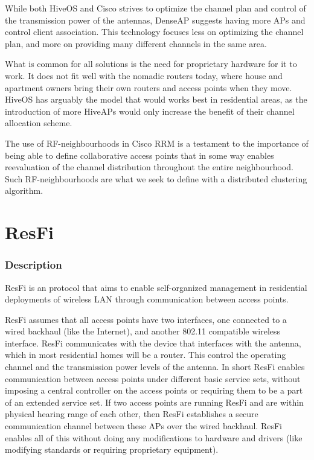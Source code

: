 		While both HiveOS and Cisco strives to optimize the channel plan and control of the transmission power of the antennas, DenseAP suggests having more APs and control client association. This technology focuses less on optimizing the channel plan, and more on providing many different channels in the same area.  

		What is common for all solutions is the need for proprietary hardware for it to work. It does not fit well with the nomadic routers today, where
		house and apartment owners bring their own routers and access points when they move.
		HiveOS has arguably the model that would works best in residential areas, as the introduction of more HiveAPs would only increase the benefit of their channel allocation scheme. 

		The use of RF-neighbourhoods in Cisco RRM is a testament to the importance of being able to define collaborative access points that in some way enables reevaluation of
		the channel distribution throughout the entire neighbourhood. Such RF-neighbourhoods are what we seek to define with a distributed clustering algorithm.

\section{ResFi}
\subsubsection{Description}
ResFi \cite{resfi} is an protocol that aims to enable self-organized management in residential deployments of wireless LAN through communication between access points.

ResFi assumes that all access points have two interfaces, one connected to a wired backhaul (like the Internet), and another
802.11 compatible wireless interface. ResFi communicates with the device that interfaces with the antenna, which in most residential homes will be a router. This control the operating channel and the transmission power levels of the antenna. In short ResFi enables communication between access points under different basic service sets, without imposing a central controller on the access points or
requiring them to be a part of an extended service set. If two access points are running ResFi and are within physical hearing range of each other, then ResFi 
establishes a secure communication channel between these APs over the wired backhaul. ResFi enables all of this without doing any modifications to hardware and drivers (like modifying standards or requiring proprietary equipment). 

